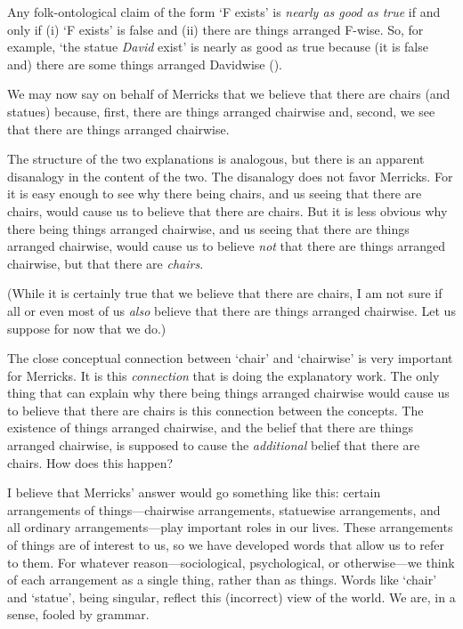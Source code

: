 \documentclass[11pt]{article}
\newenvironment{squote}{%
\begin{spacing}{1}
       	\begin{list}{}{%
\setlength{\labelwidth}{0pt}%
\rightmargin\leftmargin%
}
\item\relax
}{%
\end{list}%
\end{spacing}
}
\begin{document}
\begin{spacing}{1.25}
\begin{squote}
Any folk-ontological claim of the form `F exists' is \emph{nearly as
  good as true} if and only if (i) `F exists' is false and (ii) there
are things arranged F-wise. So, for example, `the statue \emph{David}
exist' is nearly as good as true because (it is false and) there are
some things arranged Davidwise (\citeyear[171]{merricks2001a}).
\end{squote}

We may now say on behalf of Merricks that we believe that there are
chairs (and statues) because, first, there are things arranged
chairwise and, second, we see that there are things arranged
chairwise.

The structure of the two explanations is analogous, but there is an
apparent disanalogy in the content of the two.  The disanalogy does
not favor Merricks.  For it is easy enough to see why there being
chairs, and us seeing that there are chairs, would cause us to believe
that there are chairs.  But it is less obvious why there being things
arranged chairwise, and us seeing that there are things arranged
chairwise, would cause us to believe {\em not} that there are things
arranged chairwise, but that there are {\em chairs}.

(While it is certainly true that we believe that there are chairs, I
am not sure if all or even most of us {\em also} believe that there
are things arranged chairwise.  Let us suppose for now that we do.)

The close conceptual connection between `chair' and `chairwise' is
very important for Merricks.  It is this {\em connection} that is
doing the explanatory work.  The only thing that can explain why there
being things arranged chairwise would cause us to believe that there
are chairs is this connection between the concepts.  The existence of
things arranged chairwise, and the belief that there are things
arranged chairwise, is supposed to cause the {\em additional} belief
that there are chairs.  How does this happen?

I believe that Merricks' answer would go something like this: certain
arrangements of things---chairwise arrangements, statuewise
arrangements, and all ordinary arrangements---play important roles in
our lives.  These arrangements of things are of interest to us, so we
have developed words that allow us to refer to them.  For whatever
reason---sociological, psychological, or otherwise---we think of each
arrangement as a single thing, rather than as things.  Words like
`chair' and `statue', being singular, reflect this (incorrect) view of
the world.  We are, in a sense, fooled by grammar.


\end{spacing}
\end{document}
